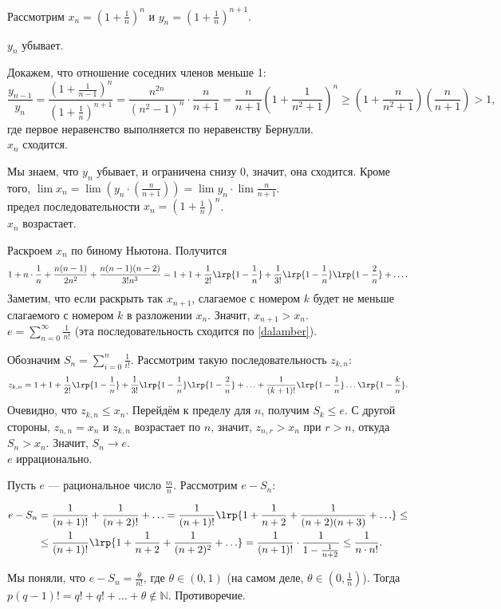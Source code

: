 \documentclass[12pt,a4paper]{article}
\begin{document}
Рассмотрим $x_n=(1+\frac{1}{n})^n$ и $y_n=(1+\frac{1}{n})^{n+1}$.

\lemma $y_n$ убывает.

\proof Докажем, что отношение соседних членов меньше 1: \[
	\frac{y_{n-1}}{y_n}=\frac{(1+\frac{1}{n-1})^n}{(1+\frac{1}{n})^{n+1}}=\frac{n^{2n}}{(n^2-1)^n}\cdot \frac{n}{n+1}=\frac{n}{n+1}(1+\frac{1}{n^2+1})^n\geq (1+\frac{n}{n^2+1})(\frac{n}{n+1})>1,
\] где первое неравенство выполняется по неравенству Бернулли.\QEDA\\

\lemma $x_n$ сходится.

\proof Мы знаем, что $y_n$ убывает, и ограничена снизу 0, значит, она сходится. Кроме того, $\lim x_n=\lim (y_n\cdot (\frac{n}{n+1}))=\lim y_n\cdot \lim \frac{n}{n+1}$.\QEDA\\

 предел последовательности $x_n=(1+\frac{1}{n})^n$.\\

\lemma $x_n$ возрастает.

\proof Раскроем $x_n$ по биному Ньютона. Получится \[
1+n\cdot \frac{1}{n}+\frac{n(n-1)}{2n^2}+\frac{n(n-1)(n-2)}{3!n^3}=1+1+\frac{1}{2!}\lrp{1-\frac{1}{n}}+\frac{1}{3!}\lrp{1-\frac{1}{n}}\lrp{1-\frac{2}{n}}+\ldots.
\] Заметим, что если раскрыть так $x_{n+1}$, слагаемое с номером $k$ будет не меньше слагаемого с номером $k$ в разложении $x_n$. Значит, $x_{n+1}>x_n$.\QEDA\\

\lemma $e=\sum_{n=0}^\infty \frac{1}{n!}$ (эта последовательность сходится по \ref{dalamber}).

\proof Обозначим $S_n=\sum_{i=0}^n \frac{1}{i!}$. Рассмотрим такую последовательность $z_{k,n}$: \[
	z_{k,n}=1+1+\frac{1}{2!}\lrp{1-\frac{1}{n}}	+\frac{1}{3!}\lrp{1-\frac{1}{n}}\lrp{1-\frac{2}{n}}+\ldots +\frac{1}{(k+1)!}\lrp{1-\frac{1}{n}} \ldots \lrp{1-\frac{k}{n}}.  
\] Очевидно, что $z_{k,n}\leq x_n$. Перейдём к пределу для $n$, получим $S_k\leq e$. С другой стороны, $z_{n,n}=x_n$ и $z_{k,n}$ возрастает по $n$, значит, $z_{n,r}>x_n$ при $r>n$, откуда $S_n>x_n$. Значит, $S_n\to e$.\QEDA\\

\theorem $e$ иррационально.

\proof Пусть $e$ --- рациональное число $\frac{m}{n}$. Рассмотрим $e-S_n$: 

\begin{align*}
	e-S_n&=\frac{1}{(n+1)!}+\frac{1}{(n+2)!}+\ldots =\frac{1}{(n+1)!}\lrp{1+\frac{1}{n+2}+\frac{1}{(n+2)(n+3)}+\ldots } \leq\\
		 &\leq \frac{1}{(n+1)!}\lrp{1+\frac{1}{n+2}+\frac{1}{(n+2)^2}+\ldots}=\frac{1}{(n+1)!}\cdot \frac{1}{1-\frac1{n+2}}\leq \frac1{n\cdot n!}.
\end{align*}

Мы поняли, что $e-S_n=\frac{\theta}{n!}$, где $\theta\in(0,1)$ (на самом деле, $\theta\in(0,\frac{1}{n})$). Тогда $p(q-1)!=q!+q!+\ldots +\theta\not\in \mathbb N $. Противоречие.\QEDA\\
\end{document}
